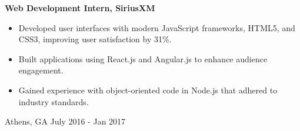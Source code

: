\documentclass[10pt, letterpaper]{article}
\newenvironment{highlights}{
    \begin{itemize}[
        topsep=0.10 cm,
        parsep=0.10 cm,
        partopsep=0pt,
        itemsep=0pt,
        leftmargin=0.4 cm + 10pt
    ]
}{
    \end{itemize}
} %
\newenvironment{twocolentry}[2][]{
    \onecolentry
    \def\secondColumn{#2}
    \setcolumnwidth{\fill, 4.5 cm}
    \begin{paracol}{2}
}{
    \switchcolumn \raggedleft \secondColumn
    \end{paracol}
    \endonecolentry
} %
\begin{document}
        \begin{twocolentry}{
            Athens, GA
        July 2016 - Jan 2017
        }
            \textbf{Web Development Intern, SiriusXM}
            \begin{highlights}
                \item Developed user interfaces with modern JavaScript frameworks, HTML5, and CSS3, improving user satisfaction by 31\%.
                \item Built applications using React.js and Angular.js to enhance audience engagement.
                \item Gained experience with object-oriented code in Node.js that adhered to industry standards.
            \end{highlights}
        \end{twocolentry}

    
\end{document}
